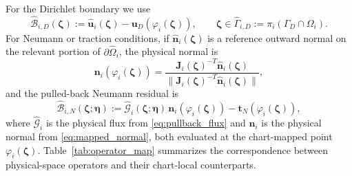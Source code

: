 \documentclass[sort&compress]{svjour3} %
\newcommand{\tensor}[1]{\ensuremath{\boldsymbol{#1}}}
\begin{document}
For the Dirichlet boundary we use
\begin{equation}
\widehat{\mathcal{B}}_{i,D}(\boldsymbol{\zeta}):=\widehat{\tensor u}_i(\boldsymbol{\zeta})-\tensor u_D(\varphi_i(\boldsymbol{\zeta})),
\qquad \boldsymbol{\zeta}\in \widehat{\Gamma}_{i,D}:=\pi_i(\Gamma_D\cap \Omega_i).
\label{eq:mapped_dirichlet}
\end{equation}
For Neumann or traction conditions, if $\widehat{\mathbf{n}}_i(\boldsymbol{\zeta})$ is a reference outward normal on the relevant portion of $\partial\widehat{\Omega}_i$, the physical normal is
\begin{equation}
\mathbf{n}_i(\varphi_i(\boldsymbol{\zeta}))
=
\frac{\mathbf{J}_i(\boldsymbol{\zeta})^{-T}\widehat{\mathbf{n}}_i(\boldsymbol{\zeta})}
{\|\mathbf{J}_i(\boldsymbol{\zeta})^{-T}\widehat{\mathbf{n}}_i(\boldsymbol{\zeta})\|},
\label{eq:mapped_normal}
\end{equation}
and the pulled-back Neumann residual is
\begin{equation}
\widehat{\mathcal{B}}_{i,N}(\boldsymbol{\zeta};\tensor\eta)
:=
\widehat{\mathcal{G}}_i(\boldsymbol{\zeta};\tensor\eta)\,\mathbf{n}_i(\varphi_i(\boldsymbol{\zeta})) - \mathbf{t}_N(\varphi_i(\boldsymbol{\zeta})),
\label{eq:mapped_neumann}
\end{equation}
where $\widehat{\mathcal{G}}_i$ is the physical flux from \eqref{eq:pullback_flux} and $\mathbf{n}_i$ is the physical normal from \eqref{eq:mapped_normal}, both evaluated at the chart-mapped point $\varphi_i(\boldsymbol{\zeta})$. Table~\ref{tab:operator_map} summarizes the correspondence between physical-space operators and their chart-local counterparts.
\end{document}
